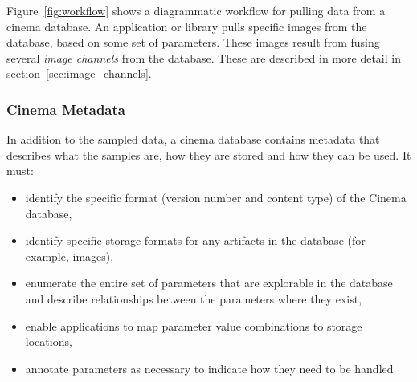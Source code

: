 Figure~\ref{fig:workflow} shows a diagrammatic workflow for pulling data from a cinema database. An application or library pulls specific images from the database, based on some set of parameters. These images result from fusing several \textit{image channels} from the database. These are described in more detail in section~\ref{sec:image_channels}.

\subsubsection{Cinema Metadata}
In addition to the sampled data, a cinema database contains metadata that describes what the samples are, how they are stored and how they can be used. It must:
\begin{itemize}
\item identify the specific format (version number and content type) of the Cinema database,
\item identify specific storage formats for any artifacts in the database (for example, images),
\item enumerate the entire set of parameters that are explorable in the database and describe relationships between the parameters where they exist,
\item enable applications to map parameter value combinations to storage locations,
\item annotate parameters as necessary to indicate how they need to be handled
\end{itemize}
